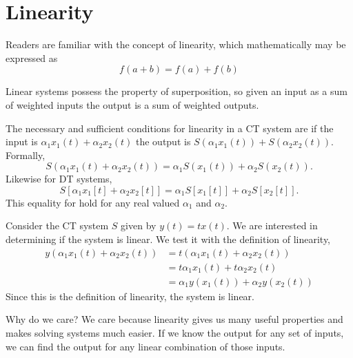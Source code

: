 \section{Linearity}
Readers are familiar with the concept
of linearity, which mathematically
may be expressed as
\begin{equation}
    f(a + b) = f(a) + f(b)
\end{equation}

Linear systems possess the property
of superposition, so given an
input as a sum of weighted inputs
the output is a sum of weighted outputs.

The necessary and sufficient
conditions for linearity in a CT
system are
if the input is $\alpha_1x_1(t)
    + \alpha_2x_2(t)$ the output
is $S(\alpha_1x_1(t)) + S(\alpha_2x_2(t))$.
Formally,
\begin{equation}
    S(\alpha_1x_1(t) + \alpha_2x_2(t)) = \alpha_1S(x_1(t)) + \alpha_2S(x_2(t)).
\end{equation}
Likewise for DT systems,
\begin{equation}
    S[\alpha_1x_1[t] + \alpha_2x_2[t]] = \alpha_1S[x_1[t]] + \alpha_2S[x_2[t]].
\end{equation}
This equality for hold for any real
valued $\alpha_1$ and $\alpha_2$.

Consider the CT system $S$ given
by $y(t) = tx(t)$. We are interested
in determining if the system is
linear. We test it with the definition
of linearity,
\begin{align}
    y(\alpha_1x_1(t) + \alpha_2x_2(t)) & = t(\alpha_1x_1(t) + \alpha_2x_2(t))    \\
                                       & = t\alpha_1x_1(t) + t\alpha_2x_2(t)     \\
                                       & = \alpha_1y(x_1(t)) + \alpha_2y(x_2(t))
\end{align}
Since this is the definition of linearity, the
system is linear.

Why do we care? We care because linearity
gives us many useful properties and
makes solving systems much easier.
If we know the output for any set of
inputs, we can find the output for
any linear combination of those inputs.
